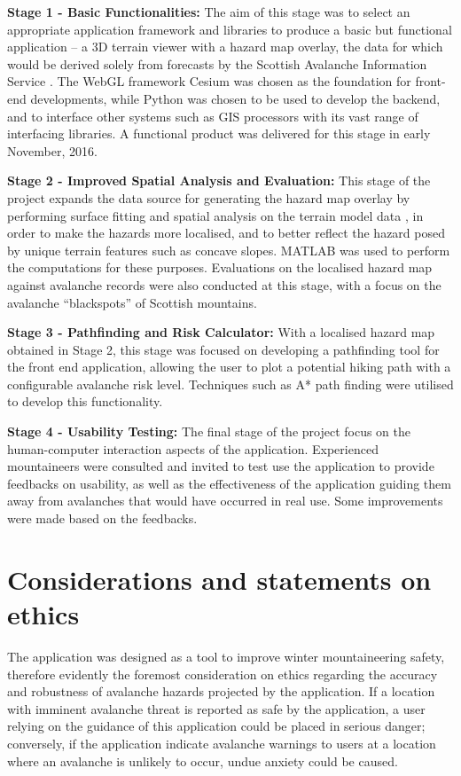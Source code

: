\documentclass[openany]{UoYCSproject}
\begin{document}
\textbf{Stage 1 - Basic Functionalities:} The aim of this stage was to select an appropriate application framework and libraries to produce a basic but functional application -- a 3D terrain viewer with a hazard map overlay, the data for which would be derived solely from forecasts by the Scottish Avalanche Information Service \cite{sais}. The WebGL framework Cesium \cite{cesium} was chosen as the foundation for front-end developments, while Python was chosen to be used to develop the backend, and to interface other systems such as GIS processors with its vast range of interfacing libraries. A functional product was delivered for this stage in early November, 2016.

\textbf{Stage 2 - Improved Spatial Analysis and Evaluation:} This stage of the project expands the data source for generating the hazard map overlay by performing surface fitting and spatial analysis on the terrain model data \cite{os-5}, in order to make the hazards more localised, and to better reflect the hazard posed by unique terrain features such as concave slopes. MATLAB \cite{matlab-primer} was used to perform the computations for these purposes. Evaluations on the localised hazard map against avalanche records were also conducted at this stage, with a focus on the avalanche ``blackspots'' of Scottish mountains.

\textbf{Stage 3 - Pathfinding and Risk Calculator:} With a localised hazard map obtained in Stage 2, this stage was focused on developing a pathfinding tool for the front end application, allowing the user to plot a potential hiking path with a configurable avalanche risk level. Techniques such as A* path finding \cite{cui2011based} were utilised to develop this functionality. 

\textbf{Stage 4 - Usability Testing:} The final stage of the project focus on the human-computer interaction aspects of the application. Experienced mountaineers were consulted and invited to test use the application to provide feedbacks on usability, as well as the effectiveness of the application guiding them away from avalanches that would have occurred in real use. Some improvements were made based on the feedbacks.

\section{Considerations and statements on ethics}

The application was designed as a tool to improve winter mountaineering safety, therefore evidently the foremost consideration on ethics regarding the accuracy and robustness of avalanche hazards projected by the application. If a location with imminent avalanche threat is reported as safe by the application, a user relying on the guidance of this application could be placed in serious danger; conversely, if the application indicate avalanche warnings to users at a location where an avalanche is unlikely to occur, undue anxiety could be caused.
\end{document}
